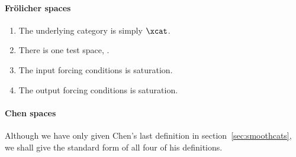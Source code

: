 \documentclass[%
a4paper,%
arxiv,%
defaults
]{myclass}
\begin{document}
\paragraph{Fr\"olicher spaces}

\begin{enumerate}
\item The underlying category is simply \(\xcat\).
\item There is one test space, \R.
\item The input forcing conditions is saturation.
\item The output forcing conditions is saturation.
\end{enumerate}

\paragraph{Chen spaces}
Although we have only given Chen's last definition in section~\ref{sec:smoothcats}, we shall give the standard form of all four of his definitions.
\end{document}
